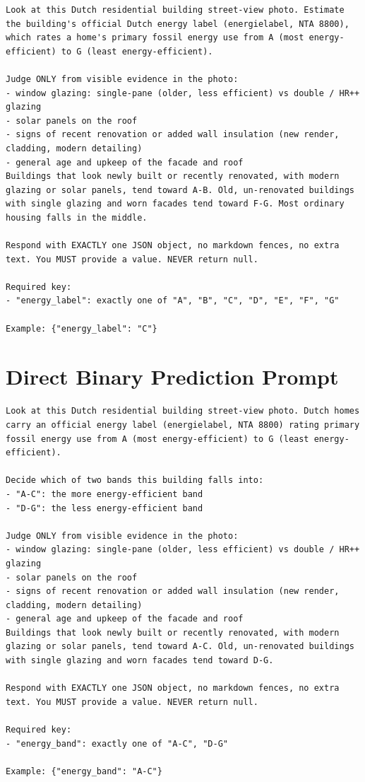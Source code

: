 \begin{lstlisting}[keywords={},mathescape=false,basicstyle=\ttfamily\footnotesize,breaklines=true]
Look at this Dutch residential building street-view photo. Estimate the building's official Dutch energy label (energielabel, NTA 8800), which rates a home's primary fossil energy use from A (most energy-efficient) to G (least energy-efficient).

Judge ONLY from visible evidence in the photo:
- window glazing: single-pane (older, less efficient) vs double / HR++ glazing
- solar panels on the roof
- signs of recent renovation or added wall insulation (new render, cladding, modern detailing)
- general age and upkeep of the facade and roof
Buildings that look newly built or recently renovated, with modern glazing or solar panels, tend toward A-B. Old, un-renovated buildings with single glazing and worn facades tend toward F-G. Most ordinary housing falls in the middle.

Respond with EXACTLY one JSON object, no markdown fences, no extra text. You MUST provide a value. NEVER return null.

Required key:
- "energy_label": exactly one of "A", "B", "C", "D", "E", "F", "G"

Example: {"energy_label": "C"}
\end{lstlisting}

\clearpage
\section{Direct Binary Prediction Prompt}
\label{sec:appendix_d_binary_prompt}

\begin{lstlisting}[keywords={},mathescape=false,basicstyle=\ttfamily\footnotesize,breaklines=true]
Look at this Dutch residential building street-view photo. Dutch homes carry an official energy label (energielabel, NTA 8800) rating primary fossil energy use from A (most energy-efficient) to G (least energy-efficient).

Decide which of two bands this building falls into:
- "A-C": the more energy-efficient band
- "D-G": the less energy-efficient band

Judge ONLY from visible evidence in the photo:
- window glazing: single-pane (older, less efficient) vs double / HR++ glazing
- solar panels on the roof
- signs of recent renovation or added wall insulation (new render, cladding, modern detailing)
- general age and upkeep of the facade and roof
Buildings that look newly built or recently renovated, with modern glazing or solar panels, tend toward A-C. Old, un-renovated buildings with single glazing and worn facades tend toward D-G.

Respond with EXACTLY one JSON object, no markdown fences, no extra text. You MUST provide a value. NEVER return null.

Required key:
- "energy_band": exactly one of "A-C", "D-G"

Example: {"energy_band": "A-C"}
\end{lstlisting}

